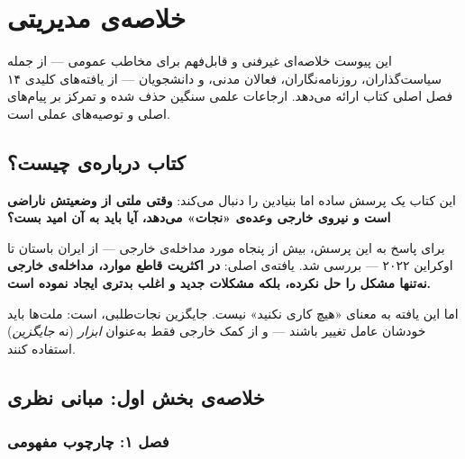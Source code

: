 \chapter{خلاصه‌ی مدیریتی}
\label{app:executive-summary}

\begin{tcolorbox}[mybox, title={درباره‌ی این پیوست}]
این پیوست خلاصه‌ای غیرفنی و قابل‌فهم برای مخاطب عمومی — از جمله سیاست‌گذاران، روزنامه‌نگاران، فعالان مدنی، و دانشجویان — از یافته‌های کلیدی ۱۴ فصل اصلی کتاب ارائه می‌دهد. ارجاعات علمی سنگین حذف شده و تمرکز بر پیام‌های اصلی و توصیه‌های عملی است.
\end{tcolorbox}

\section{کتاب درباره‌ی چیست؟}
\label{sec:app-a-about}

این کتاب یک پرسش ساده اما بنیادین را دنبال می‌کند: \textbf{وقتی ملتی از وضعیتش ناراضی است و نیروی خارجی وعده‌ی «نجات» می‌دهد، آیا باید به آن امید بست؟}

برای پاسخ به این پرسش، بیش از پنجاه مورد مداخله‌ی خارجی — از ایران باستان تا اوکراین ۲۰۲۲ — بررسی شد. یافته‌ی اصلی: \textbf{در اکثریت قاطع موارد، مداخله‌ی خارجی نه‌تنها مشکل را حل نکرده، بلکه مشکلات جدید و اغلب بدتری ایجاد نموده است.}

اما این یافته به معنای «هیچ کاری نکنید» نیست. جایگزین نجات‌طلبی،  است: ملت‌ها باید خودشان عامل تغییر باشند — و از کمک خارجی فقط به‌عنوان \textit{ابزار} (نه \textit{جایگزین}) استفاده کنند.


\section{خلاصه‌ی بخش اول: مبانی نظری}
\label{sec:app-a-part1}

\subsection{فصل ۱: چارچوب مفهومی}

